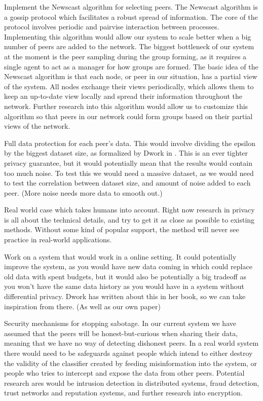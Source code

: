 Implement the Newscast algorithm for selecting peers. The Newscast algorithm is a gossip protocol which facilitates a robust spread of information. The core of the protocol involves periodic and pairvise interaction between processes. Implementing this algorithm would allow our system to scale better when a big number of peers are added to the network. The biggest bottleneck of our system at the moment is the peer sampling during the group forming, as it requires a single agent to act as a manager for how groups are formed. The basic idea of the Newscast algorithm is that each node, or peer in our situation, has a partial view of the system. All nodes exchange their views periodically, which allows them to keep an up-to-date view locally and spread their information throughout the network. Further research into this algorithm would allow us to customize this algorithm so that peers in our network could form groups based on their partial views of the network. 

Full data protection for each peer's data. This would involve dividing the epsilon by the biggest dataset size, as formalized by Dwork in . This is an ever tighter privacy guarantee, but it would potentially mean that the results would contain too much noise. To test this we would need a massive dataset, as we would need to test the correlation between dataset size, and amount of noise added to each peer. (More noise needs more data to smooth out.)

Real world case which takes humans into account. Right now research in privacy is all about the technical details, and try to get it as close as possible to existing methods. Without some kind of popular support, the method will never see practice in real-world applications. 

Work on a system that would work in a online setting. It could potentially improve the system, as you would have new data coming in which could replace old data with spent budgets, but it would also be potentially a big tradeoff as you won't have the same data history as you would have in a system without differential privacy. Dwork has written about this in her book, so we can take inspiration from there. (As well as our own paper)

Security mechanisms for stopping sabotage. In our current system we have assumed that the peers will be honest-but-curious when sharing their data, meaning that we have no way of detecting dishonest peers. In a real world system there would need to be safeguards against people which intend to either destroy the validity of the classifier created by feeding misinformation into the system, or people who tries to intercept and expose the data from other peers. Potential research ares would be intrusion detection in distributed systems, fraud detection, trust networks and reputation systems, and further research into encryption.  


\newpage
\listoftodos[Notes]

\cleardoublepage